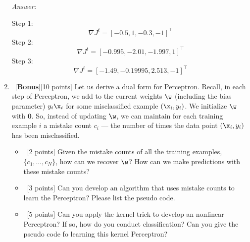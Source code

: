 \documentclass[12pt, fullpage,letterpaper]{article}
\begin{document}
\begin{enumerate}
	\textit{Answer:}

	Step 1:
	\[
		\nabla J^t = [-0.5, 1, -0.3, -1]^\top
	\]
	Step 2:
	\[
		\nabla J^t = [-0.995, -2.01, -1.997, 1]^\top
	\]
	Step 3:
	\[
		\nabla J^t = [-1.49, -0.19995, 2.513, -1]^\top
	\]


	\item~[\textbf{Bonus}][10 points] Let us derive a dual form for Perceptron. Recall, in each step of Perceptron, we add to the current weights $\w$ (including the bias parameter) $y_i\x_i$ for some misclassified example $(\x_i, y_i)$. We initialize $\w$ with $\mathbf{0}$. So, instead of updating $\w$, we can maintain for each training example $i$ a mistake count $c_i$ --- the number of times the data point $(\x_i, y_i)$ has been misclassified. 
	
	\begin{itemize}
		\item~[2 points] Given the mistake counts of all the training examples, $\{c_1, \ldots, c_N\}$, how can we recover $\w$? How can we make predictions with these mistake counts? 
		\item~[3 points] Can you develop an algorithm that uses mistake counts to learn the Perceptron? Please list the pseudo code. 
		\item~[5 points] Can you apply the kernel trick to develop an nonlinear Perceptron? If so, how do you conduct classification? Can you give the pseudo code fo learning this kernel Perceptron? 
	\end{itemize}   
	
\end{enumerate}
\end{document}
